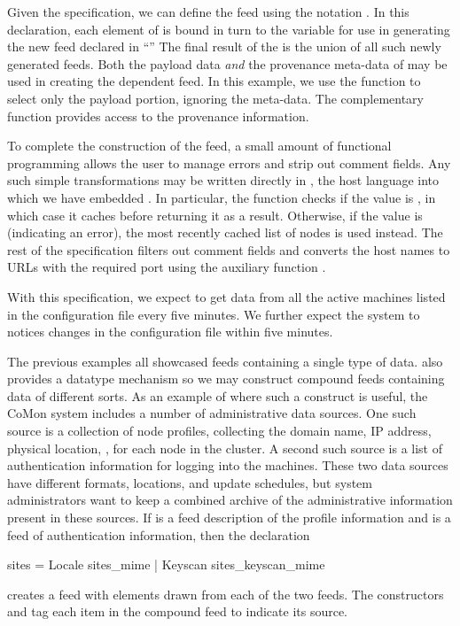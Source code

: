 Given the  specification, we can define 
the  feed using the notation 
     .
In this declaration, each element of  is bound in turn to
the variable  for use in generating the new feed
declared in ``'' 
The final result of the  is the union of all such newly
generated feeds.  Both the payload data {\em and} the provenance
meta-data of 
may be used in creating the dependent feed.  In this example, 
we use the function  to select only the payload portion,
ignoring the meta-data. The complementary function  provides
access to the provenance information.

To complete the construction of the  feed,
a small amount of functional programming allows the user 
to manage errors and strip out comment fields.  Any such simple
transformations may be written directly in \ocaml{}, the host language 
into which we have embedded \padsd{}.  In particular, 
the  function checks if
the  value is , in which case it caches 
before returning it as a result.  Otherwise, if the  value
is  (indicating an error), the most recently cached list of nodes 
is used instead.  The
rest of the  specification filters out comment fields and 
converts the host names to URLs with the required port using the
auxiliary function .


With this specification, we
expect to get data from all the active machines listed in the
configuration file every five minutes.  We further expect the system to
notices changes in the configuration file within five minutes.


The previous examples all showcased feeds containing a single type
of data.  \padsd{} also provides a datatype mechanism so we may
construct compound feeds containing data of different sorts.  As an
example of where such a construct is useful, the CoMon system includes a
number of administrative data sources.  One such source is a collection of
node profiles, collecting the domain name, IP address, physical
location, \etc, for each node in the cluster.  A second such source is a
list of authentication information for logging into the machines.
These two data sources have different formats, locations, and update
schedules, but system administrators want to keep a combined archive
of the administrative information present in these sources.  If
 is a feed description of the profile
information and  is a feed of authentication
information, then the declaration
%
\begin{code}
 sites = 
    Locale  sites_mime
  | Keyscan  sites_keyscan_mime
\end{code}
%
creates a feed with elements drawn from each of the two 
feeds.  The constructors  and  tag each item in
the compound feed to indicate its source. 

